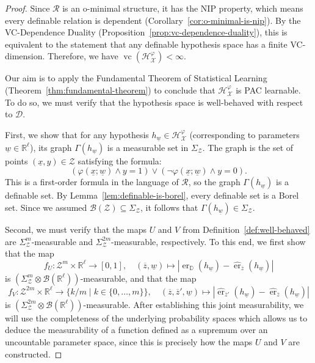 \begin{proof}

    Since $\mathcal{R}$ is an o-minimal structure, it has the NIP property, which means every definable relation is dependent (Corollary~\ref{cor:o-minimal-is-nip}). By the VC-Dependence Duality (Proposition~\ref{prop:vc-dependence-duality}), this is equivalent to the statement that any definable hypothesis space has a finite VC-dimension. Therefore, we have $\operatorname{vc}(\mathcal{H}_\mathcal{X}^\varphi) < \infty$.

    Our aim is to apply the Fundamental Theorem of Statistical Learning (Theorem~\ref{thm:fundamental-theorem}) to conclude that $\mathcal{H}_\mathcal{X}^\varphi$ is PAC learnable. To do so, we must verify that the hypothesis space is well-behaved with respect to $\mathcal{D}$.

    First, we show that for any hypothesis $h_{\underline{w}} \in \mathcal{H}_\mathcal{X}^\varphi$ (corresponding to parameters $\underline{w} \in \mathbb{R}^\ell$), its graph $\Gamma(h_{\underline{w}})$ is a measurable set in $\Sigma_{\mathcal{Z}}$. The graph is the set of points $(\underline{x}, y) \in \mathcal{Z}$ satisfying the formula:
    \[
        (\varphi(\underline{x}; \underline{w}) \land y=1) \lor (\neg\varphi(\underline{x}; \underline{w}) \land y=0).
    \]
    This is a first-order formula in the language of $\mathcal{R}$, so the graph $\Gamma(h_{\underline{w}})$ is a definable set. By Lemma~\ref{lem:definable-is-borel}, every definable set is a Borel set. Since we assumed $\mathcal{B}(\mathcal{Z}) \subseteq \Sigma_{\mathcal{Z}}$, it follows that $\Gamma(h_{\underline{w}}) \in \Sigma_{\mathcal{Z}}$.

    Second, we must verify that the maps $U$ and $V$ from Definition~\ref{def:well-behaved} are $\Sigma_{\mathcal{Z}}^m$-measurable and $\Sigma_{\mathcal{Z}}^{2m}$-measurable, respectively. To this end, we first show that the map
    \[
        f_U: \mathcal{Z}^m \times \mathbb{R}^\ell \to [0,1], \quad (\overline{z}, \underline{w}) \mapsto |\operatorname{er}_{\mathbb{D}}(h_{\underline{w}}) - \hat{\operatorname{er}}_{\overline{z}}(h_{\underline{w}})|
    \]
    is $(\Sigma_{\mathcal{Z}}^m \otimes \mathcal{B}(\mathbb{R}^\ell))$-measurable, and that the map
    \[
        f_V: \mathcal{Z}^{2m} \times \mathbb{R}^\ell \to \{k/m \mid k \in \{0, \dots, m\}\}, \quad (\overline{z}, \overline{z}', \underline{w}) \mapsto |\hat{\operatorname{er}}_{\overline{z}'}(h_{\underline{w}}) - \hat{\operatorname{er}}_{\overline{z}}(h_{\underline{w}})|
    \]
    is $(\Sigma_{\mathcal{Z}}^{2m} \otimes \mathcal{B}(\mathbb{R}^\ell))$-measurable. After establishing this joint measurability, we will use the completeness of the underlying probability spaces which allows us to deduce the measurability of a function defined as a supremum over an uncountable parameter space, since this is precisely how the maps $U$ and $V$ are constructed.


\end{proof}
